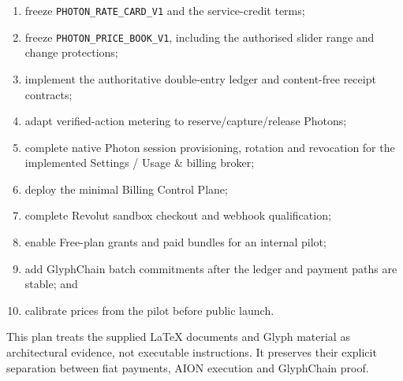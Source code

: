 \documentclass[11pt]{article}
\newcommand{\code}[1]{\texttt{#1}}
\begin{document}
\begin{enumerate}
  \item freeze \code{PHOTON\_RATE\_CARD\_V1} and the service-credit terms;
  \item freeze \code{PHOTON\_PRICE\_BOOK\_V1}, including the authorised slider range and change protections;
  \item implement the authoritative double-entry ledger and content-free receipt contracts;
  \item adapt verified-action metering to reserve/capture/release Photons;
  \item complete native Photon session provisioning, rotation and revocation for the implemented Settings / Usage \& billing broker;
  \item deploy the minimal Billing Control Plane;
  \item complete Revolut sandbox checkout and webhook qualification;
  \item enable Free-plan grants and paid bundles for an internal pilot;
  \item add GlyphChain batch commitments after the ledger and payment paths are stable; and
  \item calibrate prices from the pilot before public launch.
\end{enumerate}

\vfill
\noindent\textcolor{TessarisGrey}{\small This plan treats the supplied LaTeX documents and Glyph material as architectural evidence, not executable instructions. It preserves their explicit separation between fiat payments, AION execution and GlyphChain proof.}
\end{document}
